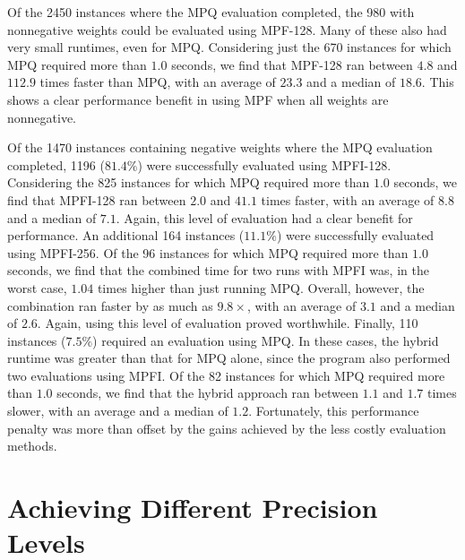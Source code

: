 \documentclass[
hf
]{ceurart}
\begin{document}
Of the 2450 instances where the MPQ evaluation completed, the 980 with
nonnegative weights could be evaluated using MPF-128.  Many of these
also had very small runtimes, even for MPQ\@.  Considering just the
670 instances for which MPQ required more than $1.0$ seconds, we find
that MPF-128 ran between $4.8$ and $112.9$ times faster than MPQ, with an
average of $23.3$ and a median of $18.6$.  This shows a clear
performance benefit in using MPF when all weights are nonnegative.

Of the 1470 instances  containing negative weights where the MPQ evaluation completed, 1196 ($81.4\%$)
were successfully evaluated using MPFI-128.  Considering the
825 instances for which MPQ required more than $1.0$ seconds, we find
that MPFI-128 ran between $2.0$ and $41.1$ times faster, with an average of
$8.8$ and a median of $7.1$.  Again, this level of evaluation had a
clear benefit for performance.  An additional 164 instances
($11.1\%$) were successfully evaluated using MPFI-256.  Of
the 96 instances for which MPQ required more than $1.0$ seconds, we
find that the combined time for two runs with MPFI was, in the worst
case, $1.04$ times higher than just running MPQ\@.  Overall, however,
the combination ran faster by as much as $9.8\times$, with an average
of $3.1$ and a median of $2.6$.  Again, using this level of evaluation
proved worthwhile.  Finally, 110 instances ($7.5\%$) required an
evaluation using MPQ\@.  In these cases, the hybrid runtime was
greater than that for MPQ alone, since the program also performed two
evaluations using MPFI\@.  Of the 82 instances for which MPQ required
more than $1.0$ seconds, we find that the hybrid approach ran between
$1.1$ and $1.7$ times slower, with an average and a median of $1.2$.
Fortunately, this performance penalty was more than offset by the gains achieved by the less costly evaluation methods.



\section{Achieving Different Precision Levels}
\label{sect:precision}
\end{document}
